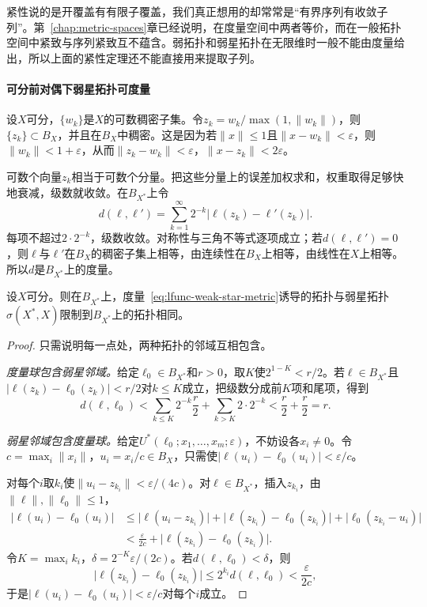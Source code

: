 紧性说的是开覆盖有有限子覆盖，我们真正想用的却常常是“有界序列有收敛子列”。第~\ref{chap:metric-spaces}章已经说明，在度量空间中两者等价，而在一般拓扑空间中紧致与序列紧致互不蕴含。弱拓扑和弱星拓扑在无限维时一般不能由度量给出，所以上面的紧性定理还不能直接用来提取子列。

\paragraph{可分前对偶下弱星拓扑可度量}
设$X$可分，$\{w_k\}$是$X$的可数稠密子集。令$z_k=w_k/\max(1,\lVert w_k\rVert)$，则$\{z_k\}\subset B_X$，并且在$B_X$中稠密。这是因为若$\lVert x\rVert\leq1$且$\lVert x-w_k\rVert<\varepsilon$，则$\lVert w_k\rVert<1+\varepsilon$，从而$\lVert z_k-w_k\rVert<\varepsilon$，$\lVert x-z_k\rVert<2\varepsilon$。

可数个向量$z_k$相当于可数个分量。把这些分量上的误差加权求和，权重取得足够快地衰减，级数就收敛。在$B_{X^*}$上令
\begin{equation}
d(\ell,\ell')=\sum_{k=1}^{\infty}2^{-k}\lvert\ell(z_k)-\ell'(z_k)\rvert .
\label{eq:lfunc-weak-star-metric}
\end{equation}
每项不超过$2\cdot2^{-k}$，级数收敛。对称性与三角不等式逐项成立；若$d(\ell,\ell')=0$，则$\ell$与$\ell'$在$B_X$的稠密子集上相等，由连续性在$B_X$上相等，由线性在$X$上相等。所以$d$是$B_{X^*}$上的度量。

\begin{lemma}[球上弱星拓扑的度量]
\label{lem:lfunc-weak-star-metric}
设$X$可分。则在$B_{X^*}$上，度量~\eqref{eq:lfunc-weak-star-metric}诱导的拓扑与弱星拓扑$\sigma(X^*,X)$限制到$B_{X^*}$上的拓扑相同。
\end{lemma}

\begin{proof}
只需说明每一点处，两种拓扑的邻域互相包含。

\emph{度量球包含弱星邻域。}给定$\ell_0\in B_{X^*}$和$r>0$，取$K$使$2^{1-K}<r/2$。若$\ell\in B_{X^*}$且$\lvert\ell(z_k)-\ell_0(z_k)\rvert<r/2$对$k\leq K$成立，把级数分成前$K$项和尾项，得到
\[
d(\ell,\ell_0)<\sum_{k\leq K}2^{-k}\frac r2+\sum_{k>K}2\cdot2^{-k}<\frac r2+\frac r2=r .
\]

\emph{弱星邻域包含度量球。}给定$U^*(\ell_0;x_1,\ldots,x_m;\varepsilon)$，不妨设各$x_i\neq0$。令$c=\max_i\lVert x_i\rVert$，$u_i=x_i/c\in B_X$，只需使$\lvert\ell(u_i)-\ell_0(u_i)\rvert<\varepsilon/c$。

对每个$i$取$k_i$使$\lVert u_i-z_{k_i}\rVert<\varepsilon/(4c)$。对$\ell\in B_{X^*}$，插入$z_{k_i}$，由$\lVert\ell\rVert,\lVert\ell_0\rVert\leq1$，
\[
\begin{aligned}
\lvert\ell(u_i)-\ell_0(u_i)\rvert
&\leq\lvert\ell(u_i-z_{k_i})\rvert+\lvert\ell(z_{k_i})-\ell_0(z_{k_i})\rvert+\lvert\ell_0(z_{k_i}-u_i)\rvert\\
&<\frac{\varepsilon}{2c}+\lvert\ell(z_{k_i})-\ell_0(z_{k_i})\rvert .
\end{aligned}
\]
令$K=\max_ik_i$，$\delta=2^{-K}\varepsilon/(2c)$。若$d(\ell,\ell_0)<\delta$，则
\[
\lvert\ell(z_{k_i})-\ell_0(z_{k_i})\rvert\leq2^{k_i}d(\ell,\ell_0)<\frac{\varepsilon}{2c} ,
\]
于是$\lvert\ell(u_i)-\ell_0(u_i)\rvert<\varepsilon/c$对每个$i$成立。
\end{proof}

